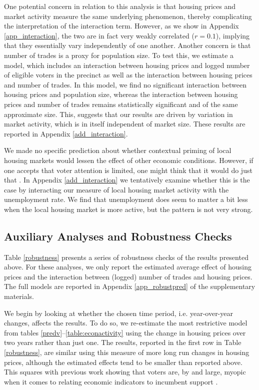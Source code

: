 \documentclass[12pt,a4paper]{article}
\begin{document}
	
	One potential concern in relation to this analysis is that housing prices and market activity measure the same underlying phenomenon, thereby complicating the interpretation of the interaction term. However, as we show in Appendix \ref{app_interaction}, the two are in fact very weakly correlated ($r=0.1$), implying that they essentially vary independently of one another. Another concern is that number of trades is a proxy for population size. To test this, we estimate a model, which includes an interaction between housing prices and logged number of eligible voters in the precinct as well as the interaction between housing prices and number of trades. In this model, we find no significant interaction between housing prices and population size, whereas the interaction between housing prices and number of trades remains statistically significant and of the same approximate size. This, suggests that our results are driven by variation in market activity, which is in itself independent of market size. These results are reported in Appendix \ref{add_interaction}.
	
	We made no specific prediction about whether contextual priming of local housing markets would lessen the effect of other economic conditions. However, if one accepts that voter attention is limited, one might think that it would do just that \citep[this is a common assertion in the broader priming literature, see for instance][]{krosnick1990altering}. In Appendix \ref{add_interaction} we tentatively examine whether this is the case by interacting our measure of local housing market activity with the unemployment rate. We find that unemployment does seem to matter a bit less when the local housing market is more active, but the pattern is not very strong. 
	
	\subsection{Auxiliary Analyses and Robustness Checks}
	Table \ref{robustness} presents a series of robustness checks of the results presented above. For these analyses, we only report the estimated average effect of housing prices and the interaction between (logged) number of trades and housing prices. The full models are reported in Appendix \ref{app_robustpred} of the supplementary materials.
	
	
	
	We begin by looking at whether the chosen time period, i.e. year-over-year changes, affects the results. To do so, we re-estimate the most restrictive model from tables \ref{predv}--\ref{table:econactivity} using the change in housing prices over two years rather than just one. The results, reported in the first row in Table \ref{robustness}, are similar using this measure of more long run changes in housing prices, although the estimated effects tend to be smaller than reported above. This squares with previous work showing that voters are, by and large, myopic when it comes to relating economic indicators to incumbent support \citep{healy2009myopic,healy2014substituting}.
	
\end{document}
